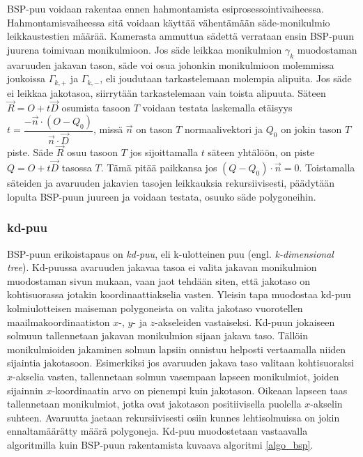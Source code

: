 \documentclass[a4paper, 12pt, titlepage]{article}
\begin{document}


BSP-puu voidaan rakentaa ennen hahmontamista esiprosessointivaiheessa. Hahmontamisvaiheessa sitä voidaan käyttää vähentämään säde-monikulmio leikkaustestien määrää. Kamerasta ammuttua sädettä verrataan ensin BSP-puun juurena toimivaan monikulmioon. Jos säde leikkaa monikulmion $\gamma_k$ muodostaman avaruuden jakavan tason, säde voi osua johonkin monikulmioon molemmissa joukoissa ${\Gamma_{k,+}}$ ja ${\Gamma_{k,-}}$, eli joudutaan tarkastelemaan molempia alipuita. Jos säde ei leikkaa jakotasoa, siirrytään tarkastelemaan vain toista alipuuta. Säteen $\vec{R}=O+t\vec{D}$ osumista tasoon $T$ voidaan testata laskemalla etäisyys $t=\dfrac{-\vec{n}\cdot(O-Q_0)}{\vec{n}\cdot\vec{D}}$, missä $\vec{n}$ on tason $T$ normaalivektori ja $Q_0$ on jokin tason $T$ piste. Säde $\vec{R}$ osuu tasoon $T$ jos sijoittamalla $t$ säteen yhtälöön, on piste $Q = O+t\vec{D}$ tasossa $T$. Tämä pitää paikkansa jos $(Q-Q_0)\cdot\vec{n} = 0$. \citep[.]{hughes} Toistamalla säteiden ja avaruuden jakavien tasojen leikkauksia rekursiivisesti, päädytään lopulta BSP-puun juureen ja voidaan testata, osuuko säde polygoneihin. \citep[.]{ranta}\\

\subsubsection{kd-puu}

BSP-puun erikoistapaus on \emph{kd-puu}, eli k-ulotteinen puu (engl. \emph{k-dimensional tree}). 
Kd-puussa avaruuden jakavaa tasoa ei valita jakavan monikulmion muodostaman sivun mukaan, vaan jaot tehdään siten, että jakotaso on kohtisuorassa  jotakin koordinaattiakselia vasten. Yleisin tapa muodostaa kd-puu kolmiulotteisen maiseman polygoneista on valita jakotaso vuorotellen maailmakoordinaatiston $x$-, $y$- ja $z$-akseleiden vastaiseksi. Kd-puun jokaiseen solmuun tallennetaan  
jakavan monikulmion sijaan jakava taso. Tällöin monikulmioiden jakaminen solmun lapsiin onnistuu helposti vertaamalla niiden sijaintia jakotasoon. Esimerkiksi jos avaruuden jakava taso valitaan kohtisuoraksi $x$-akselia vasten, tallennetaan solmun vasempaan lapseen monikulmiot, joiden sijainnin $x$-koordinaatin arvo on pienempi kuin jakotason. Oikeaan lapseen taas tallennetaan monikulmiot, jotka ovat jakotason positiivisella puolella $x$-akselin suhteen. \citep[.]{samet} Avaruutta jaetaan rekursiivisesti osiin kunnes lehtisolmuissa on jokin ennaltamäärätty määrä polygoneja. Kd-puu muodostetaan vastaavalla algoritmilla kuin BSP-puun rakentamista kuvaava algoritmi \ref{algo_bsp}.\\
\end{document}
